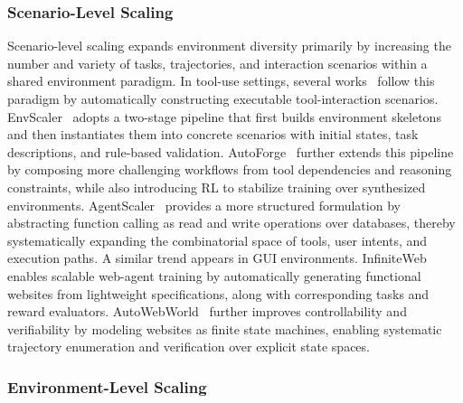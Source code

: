 \documentclass{llmxive}
\begin{document}
\subsubsection{Scenario-Level Scaling}\label{sec:Scenario-Level Scaling}
Scenario-level scaling expands environment diversity primarily by increasing the number and variety of tasks, trajectories, and interaction scenarios within a shared environment paradigm.
In tool-use settings, several works~\cite{EnvScaler,AutoForge,AgentScaler} follow this paradigm by automatically constructing executable tool-interaction scenarios.
EnvScaler~\cite{EnvScaler} adopts a two-stage pipeline that first builds environment skeletons and then instantiates them into concrete scenarios with initial states, task descriptions, and rule-based validation.
AutoForge~\cite{AutoForge} further extends this pipeline by composing more challenging workflows from tool dependencies and reasoning constraints, while also introducing RL to stabilize training over synthesized environments.
AgentScaler~\cite{AgentScaler} provides a more structured formulation by abstracting function calling as read and write operations over databases, thereby systematically expanding the combinatorial space of tools, user intents, and execution paths.
A similar trend appears in GUI environments. 
InfiniteWeb~\cite{InfiniteWeb} enables scalable web-agent training by automatically generating functional websites from lightweight specifications, along with corresponding tasks and reward evaluators.
AutoWebWorld~\cite{AutoWebWorld} further improves controllability and verifiability by modeling websites as finite state machines, enabling systematic trajectory enumeration and verification over explicit state spaces.
%
\subsubsection{Environment-Level Scaling}\label{sec:Environment-Level Scaling}
\end{document}
